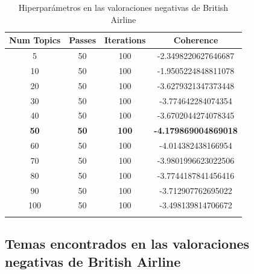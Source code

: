 \documentclass{report}
\begin{document}
                \label{tab:hiperparametros_british_airline_negativas}
                \begin{longtable}{|c|c|c|c|}
                    \hline
                    \textbf{Num Topics} & \textbf{Passes} & \textbf{Iterations} & \textbf{Coherence} \\
                    \hline
                    5 & 50 & 100 & -2.3498220627646687 \\
                    \hline
                    10 & 50 & 100 & -1.9505224848811078 \\
                    \hline
                    20 & 50 & 100 & -3.6279321347373448 \\
                    \hline
                    30 & 50 & 100 & -3.774642284074354 \\
                    \hline
                    40 & 50 & 100 & -3.6702044274078345 \\
                    \hline
                    \textbf{50} & \textbf{50} & \textbf{100} & \textbf{-4.179869004869018} \\
                    \hline
                    60 & 50 & 100 & -4.014382438166954 \\
                    \hline
                    70 & 50 & 100 & -3.9801996623022506 \\
                    \hline
                    80 & 50 & 100 & -3.7744187841456416 \\
                    \hline
                    90 & 50 & 100 & -3.712907762695022 \\
                    \hline
                    100 & 50 & 100 & -3.498139814706672 \\
                    \hline
                    \caption{Hiperparámetros en las valoraciones negativas de British Airline}
                \end{longtable}
            \clearpage\subsection{Temas encontrados en las valoraciones negativas de British Airline}
                \label{tab:temas_british_airline_negativas}
\end{document}
